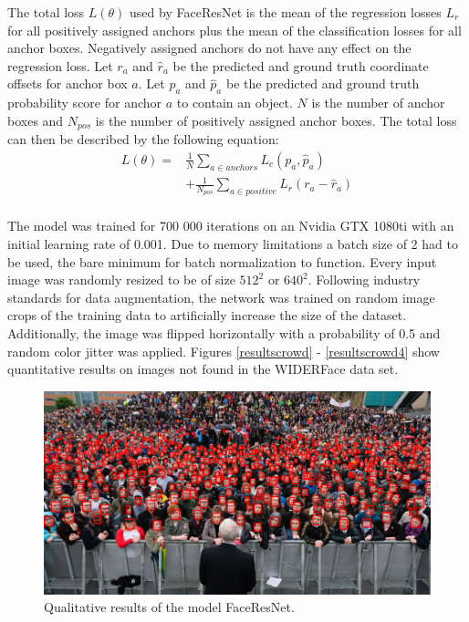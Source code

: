 \documentclass[a4paper, twoside]{article}
\begin{document}
The total loss $L(\theta)$ used by FaceResNet is the mean of the regression losses $L_r$ for all positively assigned anchors plus the mean of the classification losses for all anchor boxes. Negatively assigned anchors do not have any effect on the regression loss. Let $r_a$ and $\hat{r}_a$ be the predicted and ground truth coordinate offsets for anchor box $a$. Let $p_a$ and $\hat{p}_a$ be the predicted and ground truth probability score for anchor $a$ to contain an object. $N$ is the number of anchor boxes and $N_{pos}$ is the number of positively assigned anchor boxes. The total loss can then be described by the following equation:
\begin{equation}
\begin{split}
	L(\theta) = &  \frac{1}{N} \sum_{a \in anchors} L_c(p_a, \hat{p}_a) \\
	& + \frac{1}{N_{pos}} \sum_{a \in positive} L_r(r_a - \hat{r}_a)  \\ 
\end{split}
\end{equation}

The model was trained for 700 000 iterations on an Nvidia GTX 1080ti with an initial learning rate of 0.001. Due to memory limitations a batch size of 2 had to be used, the bare minimum for batch normalization to function. Every input image was randomly resized to be of size $512^2$ or $640^2$. Following industry standards for data augmentation, the network was trained on random image crops of the training data to artificially increase the size of the dataset. Additionally, the image was flipped horizontally with a probability of 0.5 and random color jitter was applied. Figures \ref{resultscrowd} - \ref{resultscrowd4} show quantitative results on images not found in the WIDERFace data set.
\begin{figure}[h]
  		\includegraphics[scale=0.185]{resultscrowd3.png}
  		\caption{Qualitative results of the model FaceResNet.}\label{resultscrowd3}
\end{figure}
\end{document}
